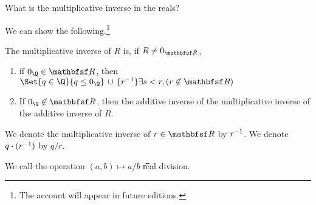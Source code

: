 

What is the multiplicative inverse in the reals?


We can show the following.\footnote{The account will appear in future editions.}

\begin{proposition}
  The multiplicative inverse of $R$ is, if $R \neq 0_{\R}$,
  \begin{enumerate}
    \item if $0_{\Q} \in \R$, then $\Set{q \in \Q}{q \leq 0_{\Q}} \union \set{r^{-1}}{\exists s < r, (r \not\in \R)}$
  \item If $0_{\Q} \not\in \R$, then the additive inverse of the multiplicative inverse of the additive inverse of $R$.
  \end{enumerate}
\end{proposition}


We denote the multiplicative inverse of $r \in \R$ by $r^{-1}$.
We denote $q \cdot (r^{-1})$ by $q/r$.


We call the operation $(a, b) \mapsto a/b$ \t{real division}.

\blankpage
